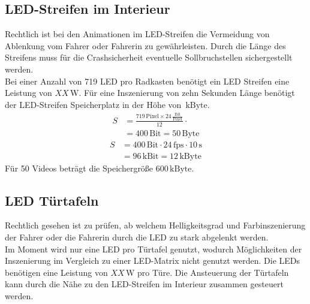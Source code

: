 \subsection{LED-Streifen im Interieur}
Rechtlich ist bei den Animationen im LED-Streifen die Vermeidung von Ablenkung vom Fahrer oder Fahrerin zu gewährleisten.
Durch die Länge des Streifens muss für die Crashsicherheit eventuelle Sollbruchstellen sichergestellt werden. \\
Bei einer Anzahl von 719 LED pro Radkasten benötigt ein LED Streifen eine Leistung von $ XX\,\mathrm{W} $.
Für eine Inszenierung von zehn Sekunden Länge benötigt der LED-Streifen Speicherplatz in der Höhe von $ \,\mathrm{kByte}$.
\begin{align}
	S &= \frac{719\,\mathrm{Pixel} \times 24\,\frac{\mathrm{Bit}}{\mathrm{Pixel}}}{12} \cdot \\
	&= 400\,\mathrm{Bit} = 50\,\mathrm{Byte}
\end{align}
\begin{align}
	S &= 400\,\mathrm{Bit} \cdot 24\,\mathrm{fps} \cdot 10\,\mathrm{s}\\
	&= 96\,\mathrm{kBit} = 12\,\mathrm{kByte}
\end{align}
Für 50 Videos beträgt die Speichergröße $ 600\,\mathrm{kByte} $.
\subsection{LED Türtafeln}
Rechtlich gesehen ist zu prüfen, ab welchem Helligkeitsgrad und Farbinszenierung der Fahrer oder die Fahrerin durch die LED zu stark abgelenkt werden. \\
Im Moment wird nur eine LED pro Türtafel genutzt, wodurch Möglichkeiten der Inszenierung im Vergleich zu einer LED-Matrix nicht genutzt werden. 
Die LEDs benötigen eine Leistung von $ XX\,\mathrm{W} $ pro Türe.
Die Ansteuerung der Türtafeln kann durch die Nähe zu den LED-Streifen im Interieur zusammen gesteuert werden.
